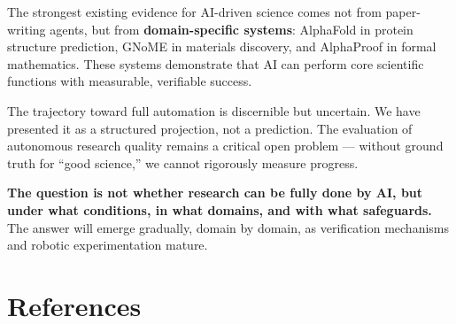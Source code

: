 \documentclass[11pt,a4paper]{article}
\begin{document}
The strongest existing evidence for AI-driven science comes not from paper-writing agents, but from \textbf{domain-specific systems}: AlphaFold in protein structure prediction, GNoME in materials discovery, and AlphaProof in formal mathematics. These systems demonstrate that AI can perform core scientific functions with measurable, verifiable success.

The trajectory toward full automation is discernible but uncertain. We have presented it as a structured projection, not a prediction. The evaluation of autonomous research quality remains a critical open problem --- without ground truth for ``good science,'' we cannot rigorously measure progress.

\textbf{The question is not whether research can be fully done by AI, but under what conditions, in what domains, and with what safeguards.} The answer will emerge gradually, domain by domain, as verification mechanisms and robotic experimentation mature.

\section*{References}
\end{document}
